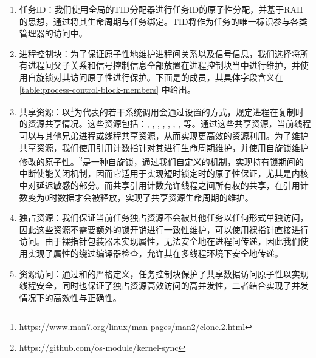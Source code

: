 \documentclass{article}
\begin{document}
\begin{enumerate}[leftmargin=2\parindent]
    \item 任务ID：我们使用全局的TID分配器进行任务ID的原子性分配，并基于RAII的思想，通过将其生命周期与任务绑定。TID将作为任务的唯一标识参与各类管理器的访问中。
    
    \item 进程控制块：为了保证原子性地维护进程间关系以及信号信息，我们选择将所有进程间父子关系和信号控制信息全部放置在进程控制块当中进行维护，并使用自旋锁对其访问原子性进行保护。下面是的成员，其具体字段含义在 \autoref{table:process-control-block-members} 中给出。
    
    \item 共享资源：以\footnote{https://www.man7.org/linux/man-pages/man2/clone.2.html}为代表的若干系统调用会通过设置的方式，规定进程在复制时的资源共享情况。这些资源包括：, , , , , , , 等。通过这些共享资源，当前线程可以与其他兄弟进程或线程共享资源，从而实现更高效的资源利用。为了维护共享资源，我们使用引用计数指针对其进行生命周期维护，并使用自旋锁维护修改的原子性。\footnote{https://github.com/os-module/kernel-sync}是一种自旋锁，通过我们自定义的机制，实现持有锁期间的中断使能关闭机制，因而它适用于实现短时锁定时的原子性保证，尤其是内核中对延迟敏感的部分。而共享引用计数允许线程之间所有权的共享，在引用计数变为0时数据才会被释放，实现了共享资源生命周期的维护。
    
    \item 独占资源：我们保证当前任务独占资源不会被其他任务以任何形式单独访问，因此这些资源不需要额外的锁开销进行一致性维护，可以使用裸指针直接进行访问。由于裸指针包装器未实现属性，无法安全地在进程间传递，因此我们使用实现了属性的绕过编译器检查，允许其在多线程环境下安全地传递。
    
    \item 资源访问：通过和的严格定义，任务控制块保护了共享数据访问原子性以实现线程安全，同时也保证了独占资源高效访问的高并发性，二者结合实现了并发情况下的高效性与正确性。
\end{enumerate}
\end{document}
